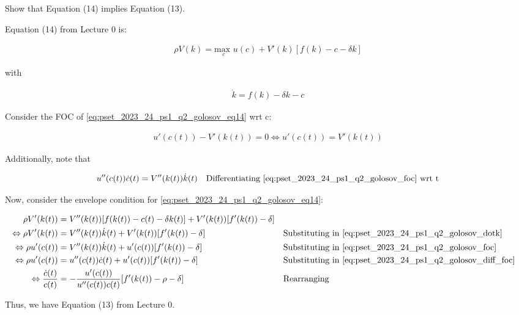 Show that Equation (14) implies Equation (13).


Equation (14) from Lecture 0 is:

\begin{align}
    \rho V(k) = \underset{c}{\text{max }} u(c) + V'(k)[f(k) - c - \delta k] \label{eq:pset_2023_24_ps1_q2_golosov_eq14}
\end{align}

with

\begin{align}
    \dot{k} = f(k) - \delta k -c \label{eq:pset_2023_24_ps1_q2_golosov_dotk}
\end{align}

Consider the FOC of \eqref{eq:pset_2023_24_ps1_q2_golosov_eq14} wrt c:

\begin{align}
    u'(c(t)) - V'(k(t)) = 0
    \Leftrightarrow u'(c(t)) = V'(k(t)) \label{eq:pset_2023_24_ps1_q2_golosov_foc}
\end{align}

Additionally, note that

\begin{align}
    u''(c(t))\dot{c}(t) = V''(k(t))\dot{k}(t) && \text{Differentiating \eqref{eq:pset_2023_24_ps1_q2_golosov_foc} wrt t} \label{eq:pset_2023_24_ps1_q2_golosov_diff_foc} \\
\end{align}

Now, consider the envelope condition for \eqref{eq:pset_2023_24_ps1_q2_golosov_eq14}:

\begin{align}
    \rho V'(k(t)) &= V''(k(t))[f(k(t)) - c(t) - \delta k(t)] + V'(k(t))[f'(k(t))-\delta] \\
    \Leftrightarrow \rho V'(k(t)) &= V''(k(t))\dot{k}(t) + V'(k(t))[f'(k(t))-\delta] && \text{Substituting in \eqref{eq:pset_2023_24_ps1_q2_golosov_dotk}}  \\
    \Leftrightarrow \rho u'(c(t)) &= V''(k(t))\dot{k}(t) + u'(c(t))[f'(k(t))-\delta] && \text{Substituting in \eqref{eq:pset_2023_24_ps1_q2_golosov_foc}} \\
    \Leftrightarrow \rho u'(c(t)) &= u''(c(t))\dot{c}(t) + u'(c(t))[f'(k(t))-\delta] && \text{Substituting in \eqref{eq:pset_2023_24_ps1_q2_golosov_diff_foc}} \\
    \Leftrightarrow \frac{\dot{c}(t)}{c(t)} &= -\frac{u'(c(t))}{u''(c(t))c(t)}[f'(k(t))-\rho - \delta] && \text{Rearranging}
\end{align}

Thus, we have Equation (13) from Lecture 0.
